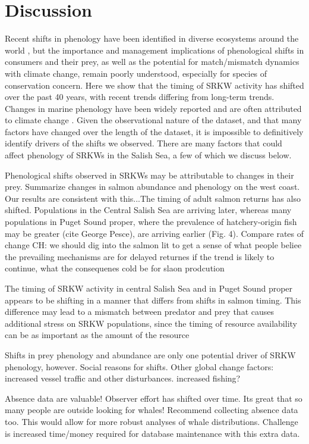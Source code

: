 \documentclass{article}
\begin{document}
\section*{Discussion}
\par Recent shifts in phenology have been identified in diverse ecosystems around the world \citep{poloczanska2013}, but the importance and management implications of phenological shifts in consumers and their prey, as well as the potential for match/mismatch dynamics with climate change, remain poorly understood, especially for species of conservation concern. Here we show that the timing of SRKW activity has shifted over the past 40 years, with recent trends differing from long-term trends. Changes in marine phenology have been widely reported and are often attributed to climate change \citep{poloczanska2013}. Given the observational nature of the dataset, and that many factors have changed over the length of the dataset, it is impossible to definitively identify drivers of the shifts we observed. There are many factors that could affect phenology of SRKWs in the Salish Sea, a few of which we discuss below.

\par Phenological shifts observed in SRKWs may be attributable to changes in their prey. Summarize changes in salmon abundance and phenology on the west coast. Our results are consistent with this...The timing of adult salmon returns has also shifted. Populations in the Central Salish Sea are arriving later, whereas many populations in Puget Sound proper, where the prevalence of hatchery-origin fish may be greater (cite George Pesce), are arriving earlier (Fig. 4). Compare rates of change
CH: we should dig into the salmon lit to get a sense of what people beliee the prevailing mechanisms are for delayed returnes if the trend is likely to continue, what the consequenes cold be for slaon prodcution
\par The timing of SRKW activity in central Salish Sea and in Puget Sound proper appears to be shifting in a manner that differs from shifts in salmon timing. This difference may lead to a mismatch between predator and prey that causes additional stress on SRKW populations, since the timing of resource availability can be as important as the amount of the resource \citep[Brianna's work,][]{hipfner2008}
\par Shifts in prey phenology and abundance are only one potential driver of SRKW phenology, however. Social reasons for shifts. Other global change factors: increased vessel traffic and other disturbances. increased fishing?
\par Absence data are valuable! Observer effort has shifted over time. Its great that so many people are outside looking for whales! Recommend collecting absence data too. This would allow for more robust analyses of whale distributions. Challenge is increased time/money required for database maintenance with this extra data.
\end{document}
